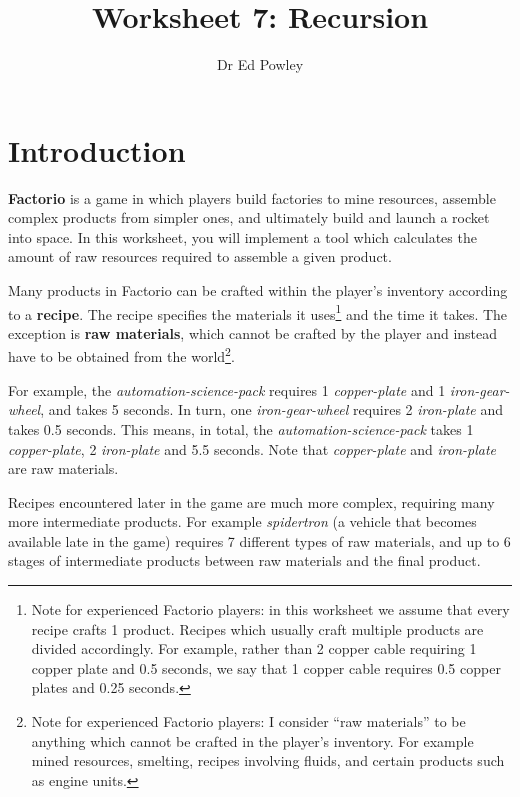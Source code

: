 \documentclass{../../../fal_assignment}
\title{Worksheet 7: Recursion}
\author{Dr Ed Powley}
\begin{document}
\maketitle
{}

\section*{Introduction}

\textbf{Factorio} is a game in which players build factories to mine resources, assemble complex products from simpler ones, and ultimately build and launch a rocket into space.
In this worksheet, you will implement a tool which calculates the amount of raw resources required to assemble a given product.

Many products in Factorio can be crafted within the player's inventory according to a \textbf{recipe}.
The recipe specifies the materials it uses\footnote{Note for experienced Factorio players:
	in this worksheet we assume that every recipe crafts 1 product. Recipes which usually craft multiple products are divided accordingly.
	For example, rather than 2 copper cable requiring 1 copper plate and 0.5 seconds, we say that 1 copper cable requires 0.5 copper plates and 0.25 seconds.}
and the time it takes.
The exception is \textbf{raw materials}, which cannot be crafted by the player and instead have to be obtained from the world\footnote{Note for experienced Factorio players:
	I consider ``raw materials'' to be anything which cannot be crafted in the player's inventory.
	For example mined resources, smelting, recipes involving fluids, and certain products such as engine units.}.

For example, the \emph{automation-science-pack} requires 1 \emph{copper-plate} and 1 \emph{iron-gear-wheel}, and takes 5 seconds.
In turn, one \emph{iron-gear-wheel} requires 2 \emph{iron-plate} and takes 0.5 seconds.
This means, in total, the \emph{automation-science-pack} takes 1 \emph{copper-plate}, 2 \emph{iron-plate} and 5.5 seconds.
Note that \emph{copper-plate} and \emph{iron-plate} are raw materials.

Recipes encountered later in the game are much more complex, requiring many more intermediate products.
For example \emph{spidertron} (a vehicle that becomes available late in the game)
requires 7 different types of raw materials, and up to 6 stages of intermediate products between raw materials and the final product.
\end{document}
